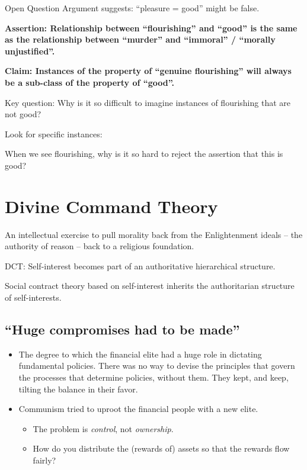\documentclass[
]{book}
\providecommand{\tightlist}{%
  \setlength{\itemsep}{0pt}\setlength{\parskip}{0pt}}
\begin{document}
Open Question Argument suggests: ``pleasure = good'' might be false.

\textbf{Assertion: Relationship between ``flourishing'' and ``good'' is the same as the relationship between ``murder'' and ``immoral'' / ``morally unjustified''.}

\textbf{Claim: Instances of the property of ``genuine flourishing'' will always be a sub-class of the property of ``good''.}

Key question: Why is it so difficult to imagine instances of flourishing that are not good?

Look for specific instances:

When we see flourishing, why is it so hard to reject the assertion that this is good?

\hypertarget{divine-command-theory}{%
\section{Divine Command Theory}\label{divine-command-theory}}

An intellectual exercise to pull morality back from the Enlightenment ideals -- the authority of reason -- back to a religious foundation.

DCT: Self-interest becomes part of an authoritative hierarchical structure.

Social contract theory based on self-interest inherits the authoritarian structure of self-interests.

\hypertarget{huge-compromises-had-to-be-made}{%
\subsection{``Huge compromises had to be made''}\label{huge-compromises-had-to-be-made}}

\begin{itemize}
\item
  The degree to which the financial elite had a huge role in dictating fundamental policies. There was no way to devise the principles that govern the processes that determine policies, without them. They kept, and keep, tilting the balance in their favor.
\item
  Communism tried to uproot the financial people with a new elite.

  \begin{itemize}
  \tightlist
  \item
    The problem is \emph{control}, not \emph{ownership}.
  \item
    How do you distribute the (rewards of) assets so that the rewards flow fairly?
  \end{itemize}
\end{itemize}
\end{document}
